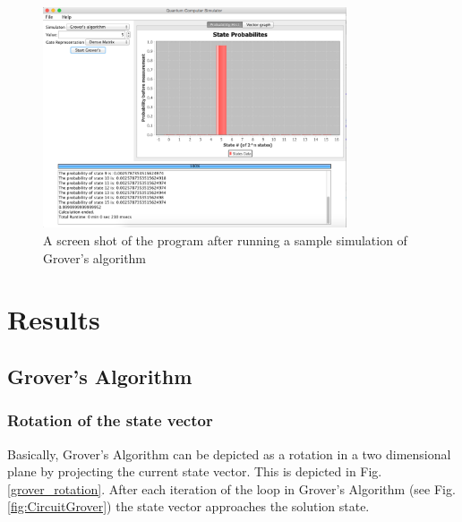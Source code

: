 \documentclass[bibliography=totocnumbered, 10pt]{article}
\theoremstyle{NoticeStyle}
\begin{document}
\begin{figure}[H]
\centering
\includegraphics[width=0.8\textwidth]{img/program_example.pdf}
\caption{A screen shot of the program after running a sample simulation of Grover's algorithm}
\end{figure}

%
\section{Results}\label{sec:Results}

\subsection{Grover's Algorithm}\label{sec:Grover}
\subsubsection{Rotation of the state vector}

Basically, Grover's Algorithm can be depicted as a rotation in a two dimensional plane by projecting the current state vector. This is depicted in Fig.\,\ref{grover_rotation}. After each iteration of the loop in Grover's Algorithm (see Fig.\,\ref{fig:CircuitGrover}) the state vector approaches the solution state.
\end{document}
